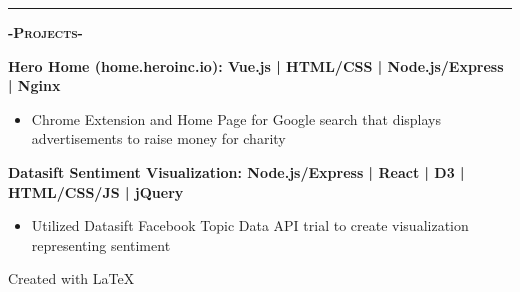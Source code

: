 \documentclass[12pt]{article}
\begin{document}
\noindent\rule{19cm}{0.4pt}

\begin{center}
\textbf{\textsc{-Projects-}}\\
\end{center}
\begin{footnotesize}

\flushleft

\color{Cerulean}\textbf{Hero Home (home.heroinc.io): \hfill\color{TealBlue} Vue.js | HTML/CSS | Node.js/Express | Nginx } 
\color{Black}
\begin{itemize}
	\item Chrome Extension and Home Page for Google search that displays advertisements to raise money for charity
\end{itemize}
\smallskip


\flushleft

\color{Cerulean}\textbf{Datasift Sentiment Visualization: \hfill \color{TealBlue} Node.js/Express | React | D3 | HTML/CSS/JS | jQuery} 
\color{Black}
\begin{itemize}
	\item Utilized Datasift Facebook Topic Data API trial to create visualization representing sentiment 
\end{itemize}
\smallskip

\end{footnotesize}

\center
Created with \LaTeX
\end{document}
